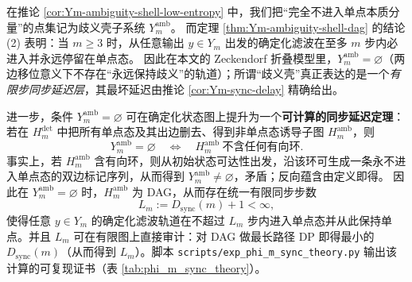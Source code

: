 \begin{remark}[歧义壳作为子系统在 \texorpdfstring{$m\ge 3$}{m>=3} 时为空]\label{rem:Ym-amb-empty}
在推论 \ref{cor:Ym-ambiguity-shell-low-entropy} 中，我们把“完全不进入单点本质分量”的点集记为歧义壳子系统 \(Y_m^{\mathrm{amb}}\)。
而定理 \ref{thm:Ym-ambiguity-shell-dag} 的结论 (2) 表明：当 \(m\ge 3\) 时，从任意输出 \(y\in Y_m\) 出发的确定化滤波在至多 \(m\) 步内必进入并永远停留在单点态。
因此在本文的 Zeckendorf 折叠模型里，\(Y_m^{\mathrm{amb}}=\varnothing\)（两边移位意义下不存在“永远保持歧义”的轨道）；所谓“歧义壳”真正表达的是一个\emph{有限步同步延迟层}，其最坏延迟由推论 \ref{cor:Ym-sync-delay} 精确给出。
\par
进一步，条件 \(Y_m^{\mathrm{amb}}=\varnothing\) 可在确定化状态图上提升为一个\textbf{可计算的同步延迟定理}：
若在 $H_m^{\mathrm{det}}$ 中把所有单点态及其出边删去、得到非单点态诱导子图 $H_m^{\mathrm{amb}}$，则
\[
Y_m^{\mathrm{amb}}=\varnothing
\quad\Longleftrightarrow\quad
H_m^{\mathrm{amb}}\ \text{不含任何有向环}.
\]
事实上，若 $H_m^{\mathrm{amb}}$ 含有向环，则从初始状态可达性出发，沿该环可生成一条永不进入单点态的双边标记序列，从而得到 \(Y_m^{\mathrm{amb}}\neq\varnothing\)，矛盾；反向蕴含由定义即得。
因此在 \(Y_m^{\mathrm{amb}}=\varnothing\) 时，$H_m^{\mathrm{amb}}$ 为 DAG，从而存在统一有限同步步数
\[
L_m:=D_{\mathrm{sync}}(m)+1<\infty,
\]
使得任意 \(y\in Y_m\) 的确定化滤波轨道在不超过 \(L_m\) 步内进入单点态并从此保持单点。并且 $L_m$ 可在有限图上直接审计：对 DAG 做最长路径 DP 即得最小的 \(D_{\mathrm{sync}}(m)\)（从而得到 \(L_m\)）。脚本 \texttt{scripts/exp\_phi\_m\_sync\_theory.py} 输出该计算的可复现证书（表 \ref{tab:phi_m_sync_theory}）。
\end{remark}



